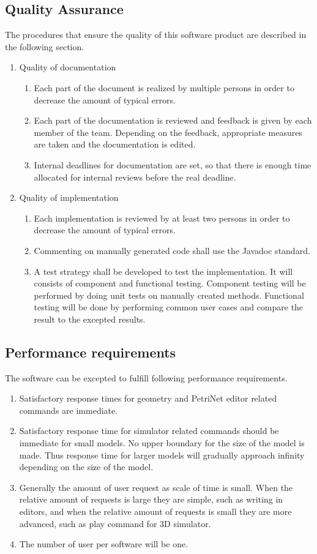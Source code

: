 \subsection{Quality Assurance}
The procedures that ensure the quality of this software product are described in the following section.
\begin{enumerate}
	\item Quality of documentation
	\begin{enumerate}
		\item Each part of the document is realized by multiple persons in order to decrease the amount of typical errors.
		\item Each part of the documentation is reviewed and feedback is given by each member of the team. Depending on the feedback, appropriate measures are taken and the documentation is edited.
		\item Internal deadlines for documentation are set, so that there is enough time allocated for internal reviews before the real deadline.
	\end{enumerate}
	\item Quality of implementation
	\begin{enumerate}
		\item Each implementation is reviewed by at least two persons in order to decrease the amount of typical errors.
		\item Commenting on manually generated code shall use the Javadoc standard.
		\item A test strategy shall be developed to test the implementation. It will consists of component and functional testing. Component testing will be performed by doing unit tests on manually created methods. Functional testing will be done by performing common user cases and compare the result to the excepted results.
	\end{enumerate}
\end{enumerate}

\subsection{Performance requirements}
The software can be excepted to fulfill following performance requirements.
\begin{enumerate}
	\item Satisfactory response times for geometry and PetriNet editor related commands are immediate.
	\item Satisfactory response time for simulator related commands should be immediate for small models. No upper boundary for the size of the model is made. Thus response time for larger models will gradually approach infinity depending on the size of the model.
	\item Generally the amount of user request as scale of time is small. When the relative amount of requests is large they are simple, such as writing in editors, and when the relative amount of requests is small they are more advanced, such as play command for 3D simulator.
	\item The number of user per software will be one.
\end{enumerate}

